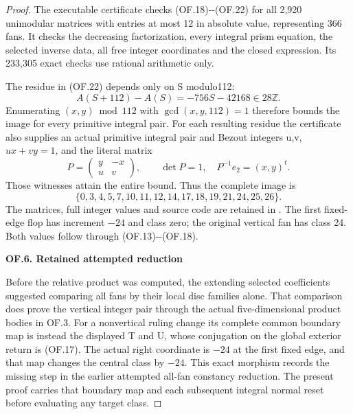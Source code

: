 \begin{proof}
The executable certificate checks (OF.18)-\/-(OF.22)
for all 2,920 unimodular matrices with entries at most
12 in absolute value, representing 366 fans. It
checks the decreasing factorization, every integral
prism equation, the selected inverse data, all free
integer coordinates and the closed expression. Its
233,305 exact checks use rational arithmetic only.

The residue in (OF.22) depends only on S modulo112:
\[
 A(S+112)-A(S)=-756S-42168\in28\mathbb Z.
\]
Enumerating \((x,y)\bmod112\) with
\(\gcd(x,y,112)=1\) therefore bounds the image for
every primitive integral pair. For each resulting
residue the certificate also supplies an actual
primitive integral pair and Bezout integers u,v,
\(ux+vy=1\), and the literal matrix
\[
 P=\begin{pmatrix}y&-x\\u&v\end{pmatrix},\qquad
 \det P=1,\quad P^{-1}e_2=(x,y)^t.
\]
Those witnesses attain the entire bound. Thus the
complete image is
\[
 \{0,3,4,5,7,10,11,12,14,17,18,19,21,24,25,26\}.
\]
The matrices, full integer values and source code
are retained in .
The first fixed-edge flop has increment \(-24\)
and class zero; the original vertical fan has class
24. Both values follow through (OF.13)-\/-(OF.18).

\par

\medskip\noindent\textbf{OF.6. Retained attempted reduction}

\par\nobreak

Before the relative product was computed, the extending
selected coefficients suggested comparing all fans by
their local disc families alone. That comparison does
prove the vertical integer pair through the actual
five-dimensional product bodies in OF.3. For a
nonvertical ruling change its complete common boundary
map is instead the displayed T and U, whose conjugation
on the global exterior return is (OF.17). The actual
right coordinate is \(-24\) at the first fixed edge,
and that map changes the central class by \(-24\).
This exact morphism records the missing step in the
earlier attempted all-fan constancy reduction. The
present proof carries that boundary map and each
subsequent integral normal reset before evaluating
any target class.

\end{proof}
